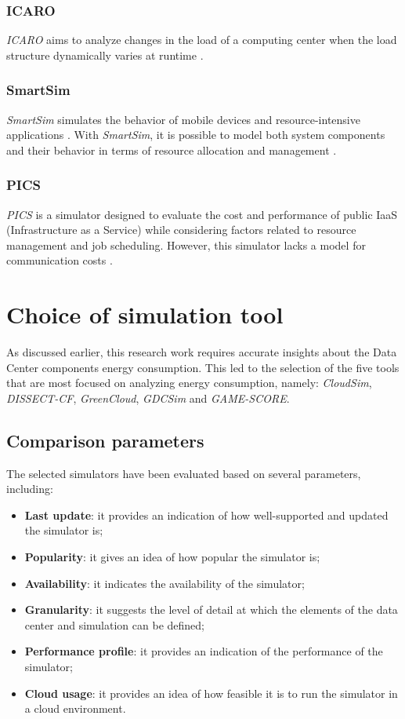 {\subsubsection{ICARO}
\emph{ICARO} \cite{badii2016icaro} aims to analyze changes in the load of a computing center when the load structure dynamically varies at runtime \cite{khalil2017cloud}.

\subsubsection{SmartSim}
\emph{SmartSim} \cite{shiraz2012extendable} simulates the behavior of mobile devices and resource-intensive applications \cite{khalil2017cloud}. With \emph{SmartSim}, it is possible to model both system components and their behavior in terms of resource allocation and management \cite{suryateja2016comparative}.

\subsubsection{PICS}
\emph{PICS} \cite{kim2015pics} is a simulator designed to evaluate the cost and performance of public IaaS (Infrastructure as a Service) while considering factors related to resource management and job scheduling. However, this simulator lacks a model for communication costs \cite{suryateja2016comparative}.


\section{Choice of simulation tool}
As discussed earlier, this research work requires accurate insights about the Data Center components energy consumption. This led to the selection of the five tools that are most focused on analyzing energy consumption, namely: \emph{CloudSim}, \emph{DISSECT-CF}, \emph{GreenCloud}, \emph{GDCSim} and \emph{GAME-SCORE}.

\subsection{Comparison parameters}
The selected simulators have been evaluated based on several parameters, including:
\begin{itemize}
    \item \textbf{Last update}: it provides an indication of how well-supported and updated the simulator is; 
    \item \textbf{Popularity}: it gives an idea of how popular the simulator is; 
    \item \textbf{Availability}: it indicates the availability of the simulator;
    \item \textbf{Granularity}: it suggests the level of detail at which the elements of the data center and simulation can be defined; 
    \item \textbf{Performance profile}: it provides an indication of the performance of the simulator;
    \item \textbf{Cloud usage}: it provides an idea of how feasible it is to run the simulator in a cloud environment.
\end{itemize}

}
